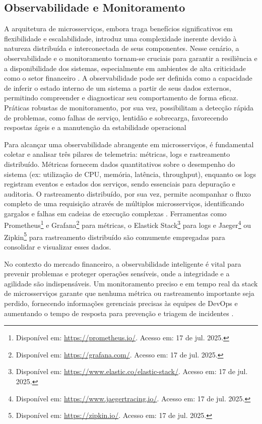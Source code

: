 \subsection{Observabilidade e Monitoramento}

A arquitetura de microsserviços, embora traga benefícios significativos em flexibilidade e escalabilidade, introduz uma complexidade inerente devido à natureza distribuída e interconectada de seus componentes. Nesse cenário, a observabilidade e o monitoramento tornam-se cruciais para garantir a resiliência e a disponibilidade dos sistemas, especialmente em ambientes de alta criticidade como o setor financeiro \cite{arditti_microsservicos_2025}. A observabilidade pode ser definida como a capacidade de inferir o estado interno de um sistema a partir de seus dados externos, permitindo compreender e diagnosticar seu comportamento de forma eficaz. Práticas robustas de monitoramento, por sua vez, possibilitam a detecção rápida de problemas, como falhas de serviço, lentidão e sobrecarga, favorecendo respostas ágeis e a manutenção da estabilidade operacional \cite[p. 156]{fowler_microsservicos_2022}

Para alcançar uma observabilidade abrangente em microsserviços, é fundamental coletar e analisar três pilares de telemetria: métricas, logs e rastreamento distribuído. Métricas fornecem dados quantitativos sobre o desempenho do sistema (ex: utilização de CPU, memória, latência, throughput), enquanto os logs registram eventos e estados dos serviços, sendo essenciais para depuração e auditoria. O rastreamento distribuído, por sua vez, permite acompanhar o fluxo completo de uma requisição através de múltiplos microsserviços, identificando gargalos e falhas em cadeias de execução complexas  \cite{ibm_o_2023}. Ferramentas como Prometheus\footnote{Disponível em: \url{https://prometheus.io/}. Acesso em: 17 de jul. 2025.} e Grafana\footnote{Disponível em: \url{https://grafana.com/}. Acesso em: 17 de jul. 2025.} para métricas, o Elastick Stack\footnote{Disponível em: \url{https://www.elastic.co/elastic-stack/}. Acesso em: 17 de jul. 2025.} para logs e Jaeger\footnote{Disponível em: \url{https://www.jaegertracing.io/}. Acesso em: 17 de jul. 2025.} ou Zipkin\footnote{Disponível em: \url{https://zipkin.io/}. Acesso em: 17 de jul. 2025.} para rastreamento distribuído são comumente empregadas para consolidar e visualizar esses dados.

No contexto do mercado financeiro, a observabilidade inteligente é vital para prevenir problemas e proteger operações sensíveis, onde a integridade e a agilidade são indispensáveis. Um monitoramento preciso e em tempo real da stack de microsserviços garante que nenhuma métrica ou rastreamento importante seja perdido, fornecendo informações gerenciais precisas às equipes de DevOps e aumentando o tempo de resposta para prevenção e triagem de incidentes \cite{baumgartner_observabilidade_2024}.